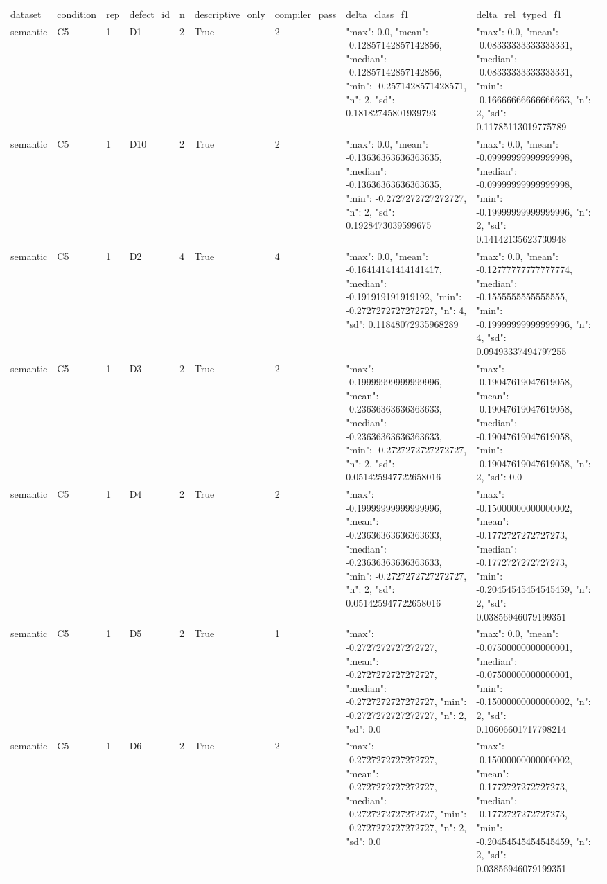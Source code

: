 \begin{tabular}{lllllllll}
dataset & condition & rep & defect\_id & n & descriptive\_only & compiler\_pass & delta\_class\_f1 & delta\_rel\_typed\_f1 \\
semantic & C5 & 1 & D1 & 2 & True & 2 & {"max": 0.0, "mean": -0.12857142857142856, "median": -0.12857142857142856, "min": -0.2571428571428571, "n": 2, "sd": 0.18182745801939793} & {"max": 0.0, "mean": -0.08333333333333331, "median": -0.08333333333333331, "min": -0.16666666666666663, "n": 2, "sd": 0.11785113019775789} \\
semantic & C5 & 1 & D10 & 2 & True & 2 & {"max": 0.0, "mean": -0.13636363636363635, "median": -0.13636363636363635, "min": -0.2727272727272727, "n": 2, "sd": 0.1928473039599675} & {"max": 0.0, "mean": -0.09999999999999998, "median": -0.09999999999999998, "min": -0.19999999999999996, "n": 2, "sd": 0.14142135623730948} \\
semantic & C5 & 1 & D2 & 4 & True & 4 & {"max": 0.0, "mean": -0.16414141414141417, "median": -0.191919191919192, "min": -0.2727272727272727, "n": 4, "sd": 0.11848072935968289} & {"max": 0.0, "mean": -0.12777777777777774, "median": -0.1555555555555555, "min": -0.19999999999999996, "n": 4, "sd": 0.09493337494797255} \\
semantic & C5 & 1 & D3 & 2 & True & 2 & {"max": -0.19999999999999996, "mean": -0.23636363636363633, "median": -0.23636363636363633, "min": -0.2727272727272727, "n": 2, "sd": 0.051425947722658016} & {"max": -0.19047619047619058, "mean": -0.19047619047619058, "median": -0.19047619047619058, "min": -0.19047619047619058, "n": 2, "sd": 0.0} \\
semantic & C5 & 1 & D4 & 2 & True & 2 & {"max": -0.19999999999999996, "mean": -0.23636363636363633, "median": -0.23636363636363633, "min": -0.2727272727272727, "n": 2, "sd": 0.051425947722658016} & {"max": -0.15000000000000002, "mean": -0.1772727272727273, "median": -0.1772727272727273, "min": -0.20454545454545459, "n": 2, "sd": 0.03856946079199351} \\
semantic & C5 & 1 & D5 & 2 & True & 1 & {"max": -0.2727272727272727, "mean": -0.2727272727272727, "median": -0.2727272727272727, "min": -0.2727272727272727, "n": 2, "sd": 0.0} & {"max": 0.0, "mean": -0.07500000000000001, "median": -0.07500000000000001, "min": -0.15000000000000002, "n": 2, "sd": 0.10606601717798214} \\
semantic & C5 & 1 & D6 & 2 & True & 2 & {"max": -0.2727272727272727, "mean": -0.2727272727272727, "median": -0.2727272727272727, "min": -0.2727272727272727, "n": 2, "sd": 0.0} & {"max": -0.15000000000000002, "mean": -0.1772727272727273, "median": -0.1772727272727273, "min": -0.20454545454545459, "n": 2, "sd": 0.03856946079199351} \\

\end{tabular}

